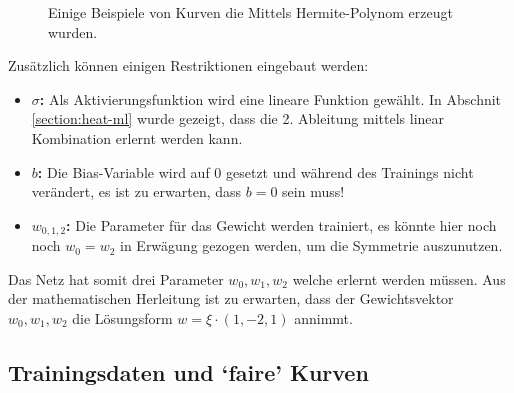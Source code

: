 \begin{figure}
	\centering
	
	\caption{Einige Beispiele von Kurven die Mittels Hermite-Polynom
	erzeugt wurden.
	\label{fig:mst_neuronalnetworkdemo} }
\end{figure}

Zusätzlich können einigen Restriktionen eingebaut werden:
\begin{itemize}
	\item {\textbf{$\sigma$:} Als Aktivierungsfunktion wird eine lineare Funktion gewählt. In Abschnit \ref{section:heat-ml} wurde gezeigt, dass die 2. Ableitung mittels linear Kombination erlernt werden kann.}
	\item {\textbf{$b$:} Die Bias-Variable wird auf 0 gesetzt und während des Trainings nicht verändert, es ist zu erwarten, dass $b=0$ sein muss!}
	\item {\textbf{$w_{0,1,2}$:} Die Parameter für das Gewicht werden trainiert, es könnte hier noch noch $w_0 = w_2$ in Erwägung gezogen werden, um die Symmetrie auszunutzen.}
\end{itemize}
Das Netz hat somit drei Parameter $w_0, w_1, w_2$ welche erlernt werden müssen. Aus der mathematischen Herleitung ist zu erwarten, dass der Gewichtsvektor  $w_0, w_1, w_2$ die Lösungsform $w = \xi \cdot (1, -2, 1)$ annimmt.

\subsection{Trainingsdaten und `faire' Kurven}
